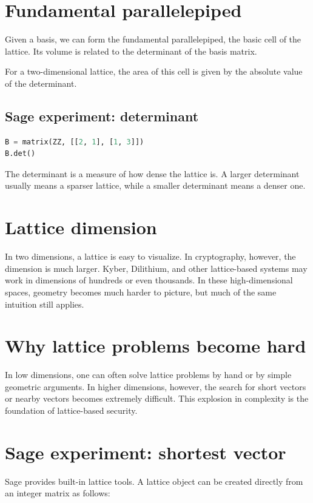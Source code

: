 \section{Fundamental parallelepiped}
Given a basis, we can form the fundamental parallelepiped, the basic cell of the lattice. Its volume is related to the determinant of the basis matrix.

For a two-dimensional lattice, the area of this cell is given by the absolute value of the determinant.

\subsection{Sage experiment: determinant}

\begin{lstlisting}[language=Python]
B = matrix(ZZ, [[2, 1], [1, 3]])
B.det()
\end{lstlisting}

The determinant is a measure of how dense the lattice is. A larger determinant usually means a sparser lattice, while a smaller determinant means a denser one.

\section{Lattice dimension}
In two dimensions, a lattice is easy to visualize. In cryptography, however, the dimension is much larger. Kyber, Dilithium, and other lattice-based systems may work in dimensions of hundreds or even thousands. In these high-dimensional spaces, geometry becomes much harder to picture, but much of the same intuition still applies.

\section{Why lattice problems become hard}
In low dimensions, one can often solve lattice problems by hand or by simple geometric arguments. In higher dimensions, however, the search for short vectors or nearby vectors becomes extremely difficult. This explosion in complexity is the foundation of lattice-based security.

\section{Sage experiment: shortest vector}
Sage provides built-in lattice tools. A lattice object can be created directly from an integer matrix as follows:

